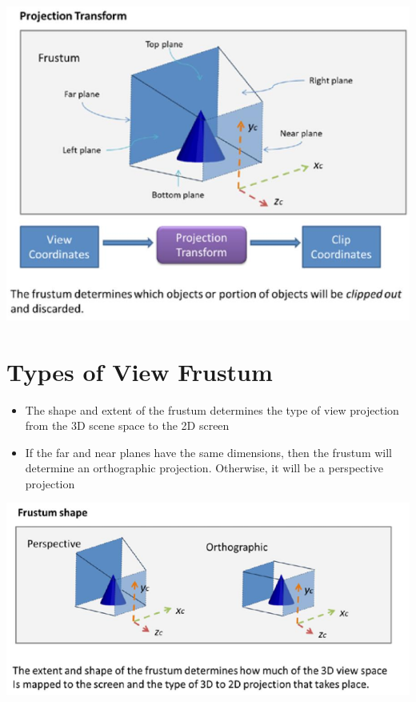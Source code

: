 \documentclass{article}[18pt]
\begin{document}
\begin{center}
	\includegraphics[scale=0.3]{"View Frustum"}
\end{center}
\section{Types of View Frustum}
\begin{itemize}
	\item The shape and extent of the frustum determines the type of view projection from the 3D scene space to the 2D screen
	\item If the far and near planes have the same dimensions, then the frustum will determine an orthographic projection. Otherwise, it will be a perspective projection
\end{itemize}

\begin{center}
	\includegraphics[scale=0.5]{"Frustum Shape"}
\end{center}
\end{document}
